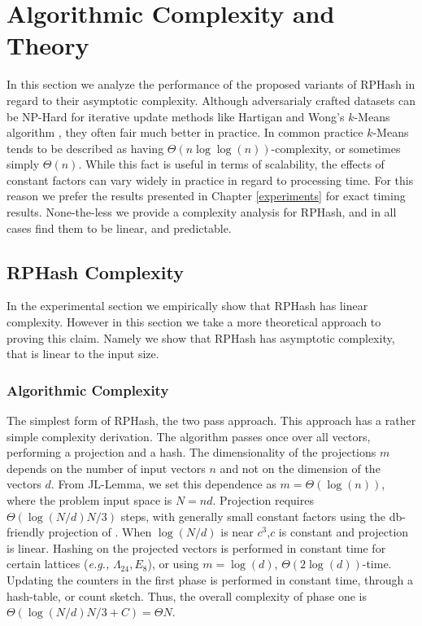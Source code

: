\chapter[Theory]{Algorithmic Complexity and Theory}\label{theory}
In this section we analyze the performance of the proposed variants of \textsf{RPHash} in regard to their asymptotic complexity.
Although adversarialy crafted datasets can be NP-Hard for iterative update methods like Hartigan and Wong's $k$-Means
algorithm \cite{Vattani}, they often fair much better in practice. In common practice $k$-Means tends to be described 
as having $\Theta(n\log\log(n))$-complexity, or sometimes simply $\Theta(n)$. While this fact is useful in terms of
scalability, the effects of constant factors can vary widely in practice in regard to processing time. For this
reason we prefer the results presented in Chapter \ref{experiments} for exact timing results. None-the-less we provide
a complexity analysis for \textsf{RPHash}, and in all cases find them to be linear, and predictable.

\section{RPHash Complexity}
In the experimental section we empirically show that \textsf{RPHash} has linear complexity. However in this section
we take a more theoretical approach to proving this claim. Namely we show that \textsf{RPHash} has asymptotic complexity,
that is linear to the input size. 

\subsection{Algorithmic Complexity}
The simplest form of \textsf{RPHash}, the two pass approach. This approach has a rather simple complexity derivation.  The
algorithm passes once over all vectors, performing a projection and a hash.  The dimensionality of
the projections $m$ depends on the number of input vectors $n$ and not on the dimension of the
vectors $d$.  From JL-Lemma, we set this dependence as $m=\Theta(\log(n))$, where the problem input
space is $N=nd$.  Projection requires $\Theta(\log(N/d)N/3)$ steps, with generally small constant
factors using the db-friendly projection of \cite{Achlioptas01}.  When $\log(N/d)$ is near $c^3$,$c$
is constant and projection is linear.  Hashing on the projected vectors is performed
in constant time for certain lattices (\emph{e.g.,} $\Lambda_{24}, E_8$), or using $m=\log(d)$, 
$\Theta(2\log(d))$-time.  Updating the counters in the first phase is performed in constant time,
through a hash-table, or count sketch.  Thus, the overall complexity of phase one is
$\Theta(\log(N/d)N/3 + C ) = \Theta{N}$.

